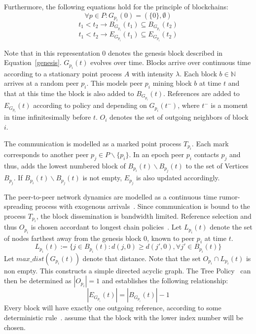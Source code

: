 Furthermore, the following equations hold for the principle of blockchains:
\begin{equation}
\forall p \in P: G_{p_i}(0) = (\{0\},\emptyset)
\label{genesis}
\end{equation}
\begin{equation}
t_1 < t_2 \rightarrow B_{G_{p_i}}(t_1) \subseteq B_{G_{p_i}}(t_2)
\label{nodegrow}
\end{equation}
\begin{equation}
t_1 < t_2 \rightarrow E_{G_{p_i}}(t_1) \subseteq E_{G_{p_i}}(t_2)
\label{edgegrow}
\end{equation}

Note that in this representation $0$ denotes the genesis block described in Equation~\ref{genesis}.
$G_{p_i}(t)$ evolves over time. Blocks arrive over continuous time according to a stationary point process $A$ with intensity $\lambda$. Each block $b \in \mathbb{N}$ arrives at a random peer $p_i$.
This models peer $p_i$ mining block $b$ at time $t$ and that at this time the block is also added to $B_{G_{p_i}}(t)$.
References are added to $E_{G_{p_i}}(t)$ according to policy and depending on $G_{p_i}(t^-)$, where $t^-$ is a moment in time infinitesimally before $t$. $O_i$ denotes the set of outgoing neighbors of block $i$.

The communication is modelled as a marked point process $T_{p_i}$.
Each mark corresponds to another peer $p_j \in P\backslash \{p_i\}$.
In an epoch peer $p_i$ contacts $p_j$ and thus, adds the lowest numbered block of $B_{p_i}(t)\backslash B_{p_j}(t)$ to the set of Vertices $B_{p_j}$. If $B_{p_i}(t)\backslash B_{p_j}(t)$ is not empty, $E_{p_j}$ is also updated accordingly.

The peer-to-peer network dynamics are modelled as a continuous time rumor-spreading process with exogenous arrivals~\citep{gopalan}. Since communication is bound to the process $T_{p_i}$, the block dissemination is bandwidth limited.
Reference selection and thus $O_{p_i}$ is chosen accordant to longest chain policies~\citep{gopalan}.
Let $L_{p_i}(t)$ denote the set of nodes farthest away from the genesis block $0$, known to peer $p_i$ at time $t$.
\begin{equation}
L_{p_i}(t) := \{j \in B_{p_i}(t): d(j,0)\geq d(j',0), \forall j' \in B_{p_i}(t) \}
\label{policy}
\end{equation}
Let $max\_ dist(G_{p_i}(t))$ denote that distance.
Note that the set $O_{p_i} \cap L_{p_i}(t)$ is non empty. This constructs a simple directed acyclic graph. The Tree Policy~\citep{gopalan} can then be determined as $|O_{p_i}|=1$ and establishes the following relationship:
\begin{equation}
|E_{G_{p_i}}(t)| = |B_{G_{p_i}}(t)| -1
\end{equation}
Every block will have exactly one outgoing reference, according to some deterministic rule~\citep{gopalan}. \citeauthor{gopalan} assume that the block with the lower index number will be chosen.


